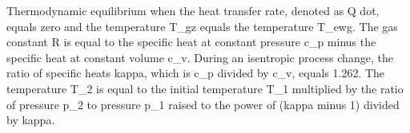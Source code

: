 Thermodynamic equilibrium when the heat transfer rate, denoted as Q dot, equals zero and the temperature T_gz equals the temperature T_ewg. The gas constant R is equal to the specific heat at constant pressure c_p minus the specific heat at constant volume c_v. During an isentropic process change, the ratio of specific heats kappa, which is c_p divided by c_v, equals 1.262. The temperature T_2 is equal to the initial temperature T_1 multiplied by the ratio of pressure p_2 to pressure p_1 raised to the power of (kappa minus 1) divided by kappa.